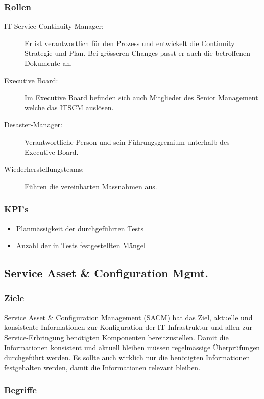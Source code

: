 \subsubsection{Rollen}

\begin{description}
	\item[IT-Service Continuity Manager:] Er ist verantwortlich für den Prozess und entwickelt die Continuity Strategie und Plan. Bei grösseren Changes passt er auch die betroffenen Dokumente an.
	\item[Executive Board:] Im Executive Board befinden sich auch Mitglieder des Senior Management welche das ITSCM auslösen.
	\item[Desaster-Manager:] Verantwortliche Person und sein Führungsgremium unterhalb des Executive Board.
	\item[Wiederherstellungsteams:] Führen die vereinbarten Massnahmen aus.
\end{description}

\subsubsection{KPI's}

\begin{itemize}
	\item Planmässigkeit der durchgeführten Tests
	\item Anzahl der in Tests festgestellten Mängel
\end{itemize}

\subsection{Service Asset \& Configuration Mgmt.}

\subsubsection{Ziele}

Service Asset \& Configuration Management (SACM) hat das Ziel, aktuelle und konsistente Informationen zur Konfiguration der IT-Infrastruktur und allen zur Service-Erbringung benötigten Komponenten bereitzustellen. Damit die Informationen konsistent und aktuell bleiben müssen regelmässige Überprüfungen durchgeführt werden. Es sollte auch wirklich nur die benötigten Informationen festgehalten werden, damit die Informationen relevant bleiben.

\subsubsection{Begriffe}

